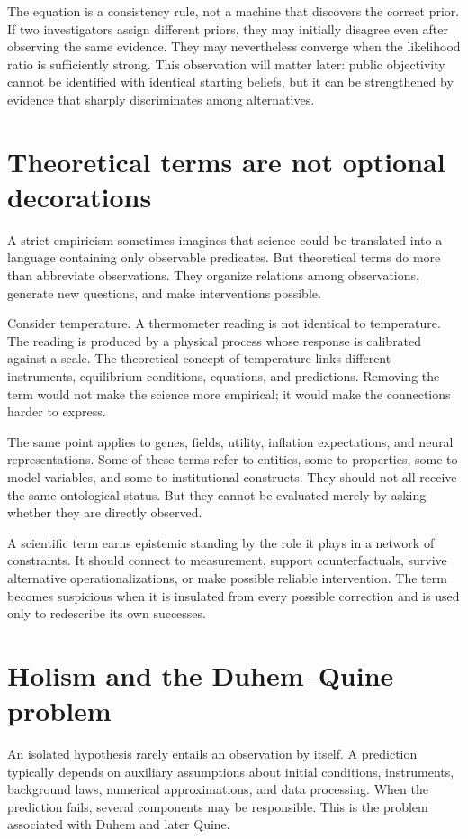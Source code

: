 The equation is a consistency rule, not a machine that discovers the correct
prior. If two investigators assign different priors, they may initially
disagree even after observing the same evidence. They may nevertheless converge
when the likelihood ratio is sufficiently strong. This observation will matter
later: public objectivity cannot be identified with identical starting
beliefs, but it can be strengthened by evidence that sharply discriminates
among alternatives.

\section{Theoretical terms are not optional decorations}

A strict empiricism sometimes imagines that science could be translated into
a language containing only observable predicates. But theoretical terms do
more than abbreviate observations. They organize relations among observations,
generate new questions, and make interventions possible.

Consider temperature. A thermometer reading is not identical to temperature.
The reading is produced by a physical process whose response is calibrated
against a scale. The theoretical concept of temperature links different
instruments, equilibrium conditions, equations, and predictions. Removing the
term would not make the science more empirical; it would make the connections
harder to express.

The same point applies to genes, fields, utility, inflation expectations, and
neural representations. Some of these terms refer to entities, some to
properties, some to model variables, and some to institutional constructs.
They should not all receive the same ontological status. But they cannot be
evaluated merely by asking whether they are directly observed.

A scientific term earns epistemic standing by the role it plays in a network
of constraints. It should connect to measurement, support counterfactuals,
survive alternative operationalizations, or make possible reliable
intervention. The term becomes suspicious when it is insulated from every
possible correction and is used only to redescribe its own successes.

\section{Holism and the Duhem--Quine problem}

An isolated hypothesis rarely entails an observation by itself. A prediction
typically depends on auxiliary assumptions about initial conditions,
instruments, background laws, numerical approximations, and data processing.
When the prediction fails, several components may be responsible. This is the
problem associated with Duhem and later Quine.

